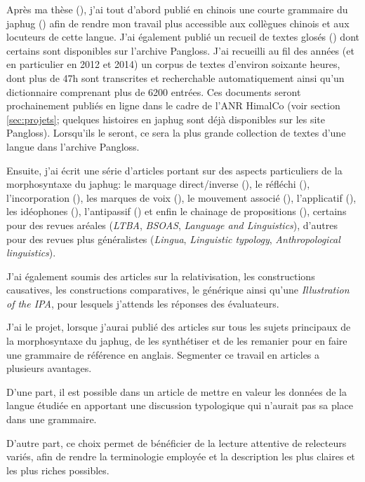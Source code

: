 \documentclass[oldfontcommands,oneside,a4paper,11pt]{article}
\begin{document}
Après ma thèse (\citealt{jacques04these}), j'ai tout d'abord publié en chinois une courte grammaire du japhug (\citealt{jacques08}) afin de rendre mon travail plus accessible aux collègues chinois et aux locuteurs de cette langue. J'ai également publié un recueil de textes glosés (\citealt{jacques10gesar}) dont certains sont disponibles sur l'archive Pangloss. J'ai recueilli au fil des années (et en particulier en 2012 et 2014) un corpus de textes d'environ soixante heures, dont plus de 47h sont transcrites et recherchable automatiquement ainsi qu'un dictionnaire comprenant plus de 6200 entrées. Ces documents seront prochainement publiés en ligne dans le cadre de l'ANR HimalCo (voir section  \ref{sec:projets}; quelques histoires en japhug sont déjà disponibles sur les site Pangloss). Lorsqu'ils le seront, ce sera la plus grande collection de textes d'une langue dans l'archive Pangloss.

Ensuite, j'ai écrit une série d'articles portant sur des aspects particuliers de la morphosyntaxe du japhug: le marquage direct/inverse (\citealt{jacques10inverse}), le réfléchi (\citealt{jacques10refl}), l'incorporation  (\citealt{jacques12incorp}), les marques de voix (\citealt{jacques12demotion}),  le mouvement associé (\citealt{jacques13harmonization}), l'applicatif (\citealt{jacques13tropative}), les idéophones (\citealt{japhug14ideophones}), l'antipassif (\citealt{jacques14antipassive}) et enfin le chainage de propositions  (\citealt{jacques14linking}), certains pour des revues aréales (\textit{LTBA}, \textit{BSOAS}, \textit{Language and Linguistics}), d'autres pour des revues plus généralistes (\textit{Lingua}, \textit{Linguistic typology}, \textit{Anthropological linguistics}). 

J'ai également soumis des articles sur la relativisation, les constructions causatives, les constructions comparatives, le générique ainsi qu'une \textit{Illustration of the IPA}, pour lesquels j'attends les réponses des évaluateurs. 

J'ai le projet, lorsque j'aurai publié des articles sur tous les sujets principaux de la morphosyntaxe du japhug, de les synthétiser et de les remanier pour en faire une grammaire de référence en anglais. Segmenter ce travail en articles a plusieurs avantages. 

D'une part, il est possible dans un article de mettre en valeur les données de la langue étudiée en apportant une discussion typologique qui n'aurait pas sa place dans une grammaire. 

D'autre part, ce choix permet de bénéficier de la lecture attentive de relecteurs variés, afin de rendre la terminologie employée et la description les plus claires et les plus riches possibles.
\end{document}
